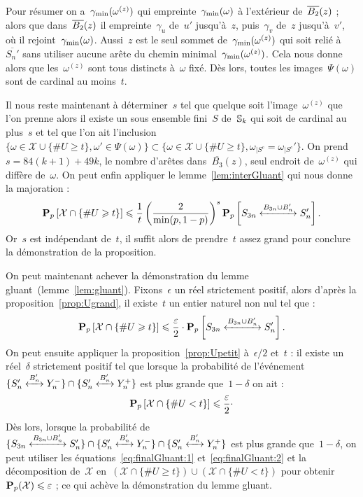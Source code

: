 \begin{dem}
				Pour résumer on a~$\Cmin[\omega^{(z)}]$ qui empreinte~$\Cmin$ à l'extérieur de~$\BRz$ ; alors que dans~$\BRz$ il empreinte~$\gamma_u$ de~$u'$ jusqu'à~$z$, puis~$\gamma_v$ de~$z$ jusqu'à~$v'$, où il rejoint~$\Cmin$. Aussi~$z$ est le seul sommet de~$\Cmin[\omega^{(z)}]$ qui soit relié à~$\overline{S_n'}$ sans utiliser aucune arête du chemin minimal~$\Cmin[\omega^{(z)}]$. Cela nous donne alors que les~$\omega^{(z)}$ sont tous distincts à~$\omega$ fixé. Dès lors, toutes les images~$\Psi(\omega)$ sont de cardinal au moins~$t$.
				
				Il nous reste maintenant à déterminer~$s$ tel que quelque soit l'image~$\omega^{(z)}$ que l'on prenne alors il existe un sous ensemble fini~$S$ de~$\Sk$ qui soit de cardinal au plus~$s$ et tel que l'on ait l'inclusion~$\{\omega\in\mathcal{X} \cup \{\# U \geq t\} ,\omega'\in\Psi(\omega)\} \subset \{\omega\in\mathcal{X} \cup \{\# U \geq t\} ,\omega_{|S^c}=\omega_{|S^c}'\}$. On prend~$s=84(k+1)+49 k$, le nombre d'arêtes dans~$\overline{B_3}(z)$, seul endroit de~$\omega^{(z)}$ qui diffère de~$\omega$. On peut enfin appliquer le lemme~\ref{lem:interGluant} qui nous donne la majoration :
				\[
					\Pp{\mathcal{X}\cap\{\# U \geq t\}} 
							\leq \frac{1}{t} \left(\frac{2}{\min(p,1-p)}\right)^s
									\Pp{\relie[B_{3n}\cup B_n']{S_{3n}}{S_n'}}.
				\]
				Or~$s$ est indépendant de~$t$, il suffit alors de prendre~$t$ assez grand pour conclure la démonstration de la proposition.
			\end{dem}
			On peut maintenant achever la démonstration du lemme gluant~(lemme~\ref{lem:gluant}). Fixons~$\epsilon$ un réel strictement positif, alors d'après la proposition~\ref{prop:Ugrand}, il existe~$t$ un entier naturel non nul tel que :
			\begin{equation}\label{eq:finalGluant:1}
					\Pp{\mathcal{X}\cap\{\#U \geq t\}} 
				\leq 
					\frac{\epsilon}{2}
					\cdot
					\Pp{\relie[B_{3n}\cup B_n']{S_{3n}}{S_n'}}.			
			\end{equation}
			On peut ensuite appliquer la proposition~\ref{prop:Upetit} à~$\epsilon/2$ et~$t$ : il existe un réel~$\delta$ strictement positif tel que lorsque la probabilité de l'événement~$\{\relie[B_n']{S_n'}{Y_n^-}\}\cap\{\relie[B_n']{S_n'}{Y_n^+}\}$ est plus grande que~$1-\delta$ on ait :
			\begin{equation}\label{eq:finalGluant:2}
				\Pp{\mathcal{X}\cap\{\#U < t\}}
				\leq
				\frac{\epsilon}{2}
				\cdot %
			\end{equation}
			Dès lors, lorsque la probabilité de~$\{\relie[B_{3n}\cup B_n']{S_{3n}}{S_n'}\} \cap \{\relie[B_n']{S_n'}{Y_n^-}\} \cap \{\relie[B_n']{S_n'}{Y_n^+}\}$ est plus grande que~$1-\delta$, on peut utiliser les équations~\eqref{eq:finalGluant:1} et~\eqref{eq:finalGluant:2} et la décomposition de~$\mathcal{X}$ en~$(\mathcal{X}\cap\{\# U \geq t\}) \cup (\mathcal{X}\cap \{\# U < t\})$  pour obtenir~$\PpSP(\mathcal{X}) \leq \epsilon$ ; ce qui achève la démonstration du lemme gluant.

